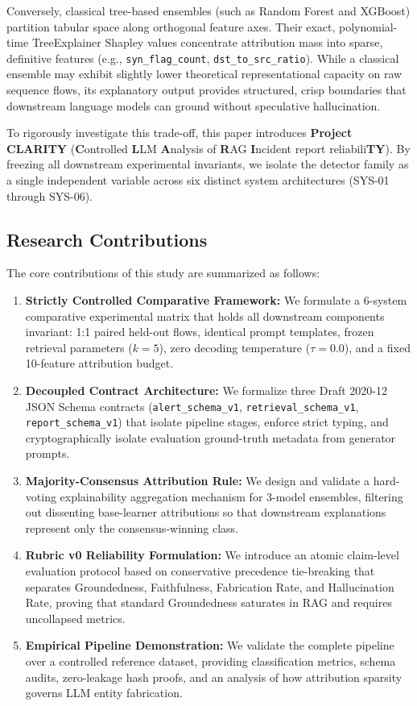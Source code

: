 \documentclass[conference]{IEEEtran}
\begin{document}
Conversely, classical tree-based ensembles (such as Random Forest and XGBoost) partition tabular space along orthogonal feature axes. Their exact, polynomial-time TreeExplainer Shapley values concentrate attribution mass into sparse, definitive features (e.g., \texttt{syn\_flag\_count}, \texttt{dst\_to\_src\_ratio}). While a classical ensemble may exhibit slightly lower theoretical representational capacity on raw sequence flows, its explanatory output provides structured, crisp boundaries that downstream language models can ground without speculative hallucination.

To rigorously investigate this trade-off, this paper introduces \textbf{Project CLARITY} (\textbf{C}ontrolled \textbf{L}LM \textbf{A}nalysis of \textbf{R}AG \textbf{I}ncident report reliabili\textbf{TY}). By freezing all downstream experimental invariants, we isolate the detector family as a single independent variable across six distinct system architectures (SYS-01 through SYS-06).

\subsection{Research Contributions}
The core contributions of this study are summarized as follows:
\begin{enumerate}
    \item \textbf{Strictly Controlled Comparative Framework:} We formulate a 6-system comparative experimental matrix that holds all downstream components invariant: 1:1 paired held-out flows, identical prompt templates, frozen retrieval parameters ($k=5$), zero decoding temperature ($\tau=0.0$), and a fixed 10-feature attribution budget.
    \item \textbf{Decoupled Contract Architecture:} We formalize three Draft 2020-12 JSON Schema contracts (\texttt{alert\_schema\_v1}, \texttt{retrieval\_schema\_v1}, \texttt{report\_schema\_v1}) that isolate pipeline stages, enforce strict typing, and cryptographically isolate evaluation ground-truth metadata from generator prompts.
    \item \textbf{Majority-Consensus Attribution Rule:} We design and validate a hard-voting explainability aggregation mechanism for 3-model ensembles, filtering out dissenting base-learner attributions so that downstream explanations represent only the consensus-winning class.
    \item \textbf{Rubric v0 Reliability Formulation:} We introduce an atomic claim-level evaluation protocol based on conservative precedence tie-breaking that separates Groundedness, Faithfulness, Fabrication Rate, and Hallucination Rate, proving that standard Groundedness saturates in RAG and requires uncollapsed metrics.
    \item \textbf{Empirical Pipeline Demonstration:} We validate the complete pipeline over a controlled reference dataset, providing classification metrics, schema audits, zero-leakage hash proofs, and an analysis of how attribution sparsity governs LLM entity fabrication.
\end{enumerate}
\end{document}
